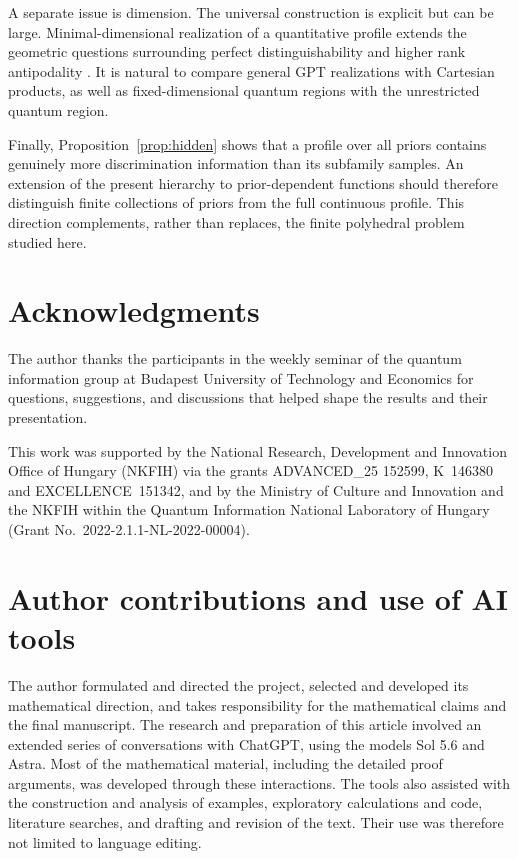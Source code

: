 \documentclass[10pt,a4paper]{amsart}
\newcommand{\1}{\mathbf 1}
\begin{document}
A separate issue is dimension. The universal construction is explicit but can
be large. Minimal-dimensional realization of a quantitative profile extends
the geometric questions surrounding perfect distinguishability and higher rank
antipodality \cite{Weiner2025,NaszodiSzilagyiWeiner2025}. It is natural to compare
general GPT realizations with Cartesian products, as well as fixed-dimensional
quantum regions with the unrestricted quantum region.

Finally, Proposition~\ref{prop:hidden} shows that a profile over all priors
contains genuinely more discrimination information than its subfamily samples.
An extension of the present hierarchy to prior-dependent functions should
therefore distinguish finite collections of priors from the full continuous
profile. This direction complements, rather than replaces, the finite
polyhedral problem studied here.

\section*{Acknowledgments}
The author thanks the participants in the weekly seminar of the quantum
information group at Budapest University of Technology and Economics for
questions, suggestions, and discussions that helped shape the results and
their presentation.

This work was supported by the National Research, Development and Innovation
Office of Hungary (NKFIH) via the grants ADVANCED\_25 152599, K~146380 and
EXCELLENCE~151342, and by the Ministry of Culture and Innovation and the NKFIH
within the Quantum Information National Laboratory of Hungary
(Grant No.~2022-2.1.1-NL-2022-00004).

\section*{Author contributions and use of AI tools}
The author formulated and directed the project, selected and developed its
mathematical direction, and takes responsibility for the mathematical claims
and the final manuscript. The research and preparation of this article
involved an extended series of conversations with ChatGPT, using the models
Sol 5.6 and Astra. Most of the mathematical material, including the detailed
proof arguments, was developed through these interactions. The tools also
assisted with the construction and analysis of examples, exploratory
calculations and code, literature searches, and drafting and revision of the
text. Their use was therefore not limited to language editing.
\end{document}
